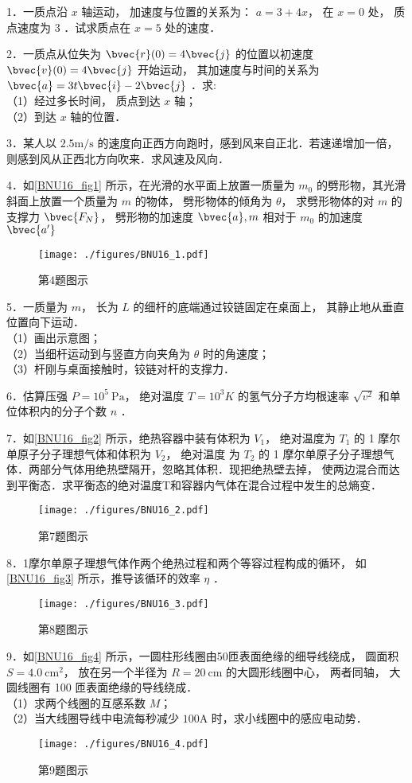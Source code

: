 
1．一质点沿 $x$ 轴运动， 加速度与位置的关系为： $a=3+4 x$， 在 $x=0$ 处， 质点速度为 3 ．试求质点在 $x=5$ 处的速度．

2．一质点从位失为 $\bvec{r}(0)=4 \bvec{j}$ 的位置以初速度 $\bvec{v}(0)=4 \bvec{j}$ 开始运动， 其加速度与时间的关系为 $\bvec{a}=3 t \bvec{i}-2 \bvec{j}$ ．求:\\
（1）经过多长时间， 质点到达 $x$ 轴；\\
（2）到达 $x$ 轴的位置．

3．某人以 $2.5 \mathrm{m / s}$ 的速度向正西方向跑时，感到风来自正北．若速递增加一倍， 则感到风从正西北方向吹来．求风速及风向．

4．如\autoref{BNU16_fig1} 所示，在光滑的水平面上放置一质量为 $m_{0}$ 的劈形物，其光滑斜面上放置一个质量为 $m$ 的物体， 劈形物体的倾角为 $\theta$， 求劈形物体的对 $m$ 的支撑力 $\bvec{F_{N}}$， 劈形物的加速度 $\bvec{a}, m$ 相对于 $m_{0}$ 的加速度 $\bvec{a^{\prime}}$
\begin{figure}[ht]
\centering
\texttt{[image: ./figures/BNU16\_1.pdf]}
\caption{第4题图示} \label{BNU16_fig1}
\end{figure}
5．一质量为 $m$， 长为 $L$ 的细杆的底端通过铰链固定在桌面上， 其静止地从垂直位置向下运动．\\
（1）画出示意图；\\
（2）当细杆运动到与竖直方向夹角为 $\theta$ 时的角速度；\\
（3）杆刚与桌面接触时，铰链对杆的支撑力．

6．估算压强 $P=10^{5} \mathrm{~Pa}$， 绝对温度 $T=10^{3} K$ 的氢气分子方均根速率 $\sqrt{v^{2}}$ 和单位体积内的分子个数 $n$ ．

7．如\autoref{BNU16_fig2} 所示，绝热容器中装有体积为 $V_{1}$， 绝对温度为 $T_{1}$ 的 1 摩尔单原子分子理想气体和体积为 $V_{2}$， 绝对温度 为 $T_{2}$ 的 1 摩尔单原子分子理想气体．两部分气体用绝热壁隔开，忽略其体积．现把绝热壁去掉， 使两边混合而达到平衡态．求平衡态的绝对温度T和容器内气体在混合过程中发生的总熵变．
\begin{figure}[ht]
\centering
\texttt{[image: ./figures/BNU16\_2.pdf]}
\caption{第7题图示} \label{BNU16_fig2}
\end{figure}
8．1摩尔单原子理想气体作两个绝热过程和两个等容过程构成的循环， 如\autoref{BNU16_fig3} 所示，推导该循环的效率 $\eta$ ．
\begin{figure}[ht]
\centering
\texttt{[image: ./figures/BNU16\_3.pdf]}
\caption{第8题图示} \label{BNU16_fig3}
\end{figure}
9．如\autoref{BNU16_fig4} 所示，一圆柱形线圈由50匝表面绝缘的细导线绕成， 圆面积 $S=4.0 \mathrm{~cm}^{2}$， 放在另一个半径为 $R=20 \mathrm{~cm}$ 的大圆形线圈中心， 两者同轴， 大圆线圈有 100 匝表面绝缘的导线绕成．\\
（1）求两个线圈的互感系数 $M$；\\
（2）当大线圈导线中电流每秒减少 $100\mathrm{A}$ 时，求小线圈中的感应电动势．
\begin{figure}[ht]
\centering
\texttt{[image: ./figures/BNU16\_4.pdf]}
\caption{第9题图示} \label{BNU16_fig4}
\end{figure}

